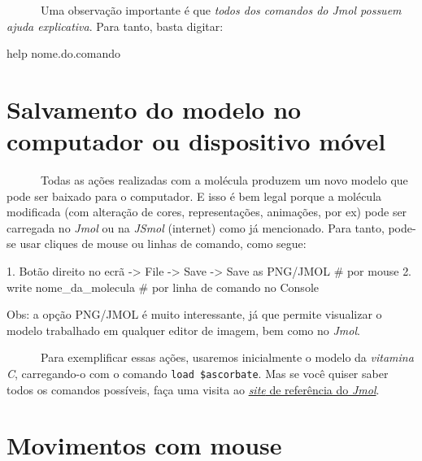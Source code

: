 \documentclass[
  letterpaper,
  DIV=11,
  numbers=noendperiod]{scrreprt}
\newenvironment{Shaded}{\begin{snugshade}}{\end{snugshade}}
\newcommand{\CommentTok}[1]{\textcolor[rgb]{0.37,0.37,0.37}{#1}}
\newcommand{\FloatTok}[1]{\textcolor[rgb]{0.68,0.00,0.00}{#1}}
\newcommand{\NormalTok}[1]{\textcolor[rgb]{0.00,0.23,0.31}{#1}}
\newcommand{\OtherTok}[1]{\textcolor[rgb]{0.00,0.23,0.31}{#1}}
\newcommand{\SpecialCharTok}[1]{\textcolor[rgb]{0.37,0.37,0.37}{#1}}
\begin{document}
~~~~~~Uma observação importante é que \emph{todos dos comandos do Jmol
possuem ajuda explicativa}. Para tanto, basta digitar:

\begin{Shaded}
\begin{Highlighting}[]
\NormalTok{help nome.do.comando}
\end{Highlighting}
\end{Shaded}

\section{Salvamento do modelo no computador ou dispositivo
móvel}\label{salvamento-do-modelo-no-computador-ou-dispositivo-muxf3vel}

~~~~~~Todas as ações realizadas com a molécula produzem um novo modelo
que pode ser baixado para o computador. E isso é bem legal porque a
molécula modificada (com alteração de cores, representações, animações,
por ex) pode ser carregada no \emph{Jmol} ou na \emph{JSmol} (internet)
como já mencionado. Para tanto, pode-se usar cliques de mouse ou linhas
de comando, como segue:

\begin{Shaded}
\begin{Highlighting}[]
\FloatTok{1.}\NormalTok{ Botão direito no ecrã }\OtherTok{{-}\textgreater{}}\NormalTok{ File }\OtherTok{{-}\textgreater{}}\NormalTok{ Save }\OtherTok{{-}\textgreater{}}\NormalTok{ Save as PNG}\SpecialCharTok{/}\NormalTok{JMOL }\CommentTok{\# por mouse}
\FloatTok{2.}\NormalTok{ write nome\_da\_molecula }\CommentTok{\# por linha de comando no Console}
\end{Highlighting}
\end{Shaded}

Obs: a opção PNG/JMOL é muito interessante, já que permite visualizar o
modelo trabalhado em qualquer editor de imagem, bem como no \emph{Jmol}.

~~~~~~Para exemplificar essas ações, usaremos inicialmente o modelo da
\emph{vitamina C}, carregando-o com o comando
\texttt{load\ \$ascorbate}. Mas se você quiser saber todos os comandos
possíveis, faça uma visita ao
\href{https://chemapps.stolaf.edu/jmol/docs/}{\emph{site} de referência
do \emph{Jmol}}.

\section{Movimentos com mouse}\label{movimentos-com-mouse}
\end{document}
